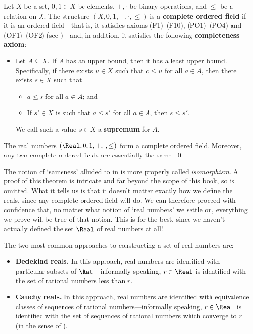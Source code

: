 \begin{axioms}
\label{axCompleteOrderedField}
Let $X$ be a set, $0,1 \in X$ be elements, $+,{\cdot}$ be binary operations, and $\le$ be a relation on $X$. The structure $(X,0,1,+,{\cdot},{\le})$ is a \textbf{complete ordered field} if it is an ordered field---that is, it satisfies axioms (F1)--(F10), (PO1)--(PO4) and (OF1)--(OF2) (see )---and, in addition, it satisfies the following \textbf{completeness axiom}:
\begin{itemize}[leftmargin=30pt]
\item[(C1)] Let $A \subseteq X$. If $A$ has an upper bound, then it has a least upper bound. Specifically, if there exists $u \in X$ such that $a \le u$ for all $a \in A$, then there exists $s \in X$ such that
\begin{itemize}
\item $a \le s$ for all $a \in A$; and
\item If $s' \in X$ is such that $a \le s'$ for all $a \in A$, then $s \le s'$.
\end{itemize}
We call such a value $s \in X$ a \textbf{supremum} for $A$.
\end{itemize}
\end{axioms}

\begin{theorem}
\label{thmRIsTheUniqueCompleteOrderedField}
The real numbers $(\Real,0,1,+,\cdot,\le)$ form a complete ordered field. Moreover, any two complete ordered fields are essentially the same. \qed
\end{theorem}

The notion of `sameness' alluded to in  is more properly called \textit{isomorphism}. A proof of this theorem is intricate and far beyond the scope of this book, so is omitted. What it tells us is that it doesn't matter exactly how we define the reals, since any complete ordered field will do. We can therefore proceed with confidence that, no matter what notion of `real numbers' we settle on, everything we prove will be true of that notion. This is for the best, since we haven't actually defined the set $\Real$ of real numbers at all!

The two most common approaches to constructing a set of real numbers are:
\begin{itemize}
\item \textbf{Dedekind reals.} In this approach, real numbers are identified with particular subsets of $\Rat$---informally speaking, $r \in \Real$ is identified with the set of rational numbers less than $r$.
\item \textbf{Cauchy reals.} In this approach, real numbers are identified with equivalence classes of sequences of rational numbers---informally speaking, $r \in \Real$ is identified with the set of sequences of rational numbers which converge to $r$ (in the sense of ).
\end{itemize}